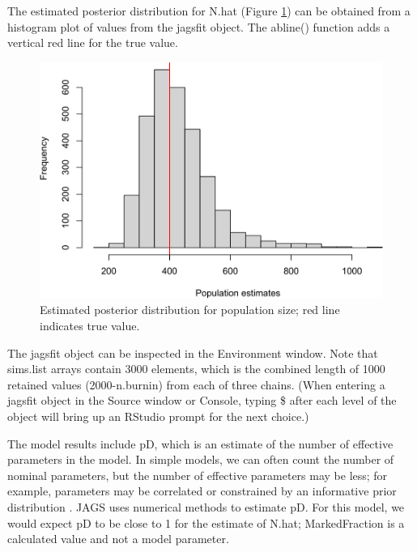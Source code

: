 \documentclass[
]{krantz}
\makeatletter
\newenvironment{Shaded}{\begin{snugshade}}{\end{snugshade}}
\newcommand{\AttributeTok}[1]{\textcolor[rgb]{0.27,0.27,0.27}{#1}}
\newcommand{\FunctionTok}[1]{\textcolor[rgb]{0.27,0.27,0.27}{\textbf{#1}}}
\newcommand{\NormalTok}[1]{#1}
\newcommand{\SpecialCharTok}[1]{\textcolor[rgb]{0.43,0.43,0.43}{\textbf{#1}}}
\newcommand{\StringTok}[1]{\textcolor[rgb]{0.5,0.5,0.5}{#1}}
\newenvironment{kframe}{%
\medskip{}
\setlength{\fboxsep}{.8em}
 \def\at@end@of@kframe{}%
 \ifinner\ifhmode%
  \def\at@end@of@kframe{\end{minipage}}%
  \begin{minipage}{\columnwidth}%
 \fi\fi%
 \def\FrameCommand##1{\hskip\@totalleftmargin \hskip-\fboxsep
 \colorbox{shadecolor}{##1}\hskip-\fboxsep
     \hskip-\linewidth \hskip-\@totalleftmargin \hskip\columnwidth}%
 \MakeFramed {\advance\hsize-\width
   \@totalleftmargin\z@ \linewidth\hsize
   \@setminipage}}%
 {\par\unskip\endMakeFramed%
 \at@end@of@kframe}
\renewenvironment{Shaded}{\begin{kframe}}{\end{kframe}}
\makeatother
\begin{document}
The estimated posterior distribution for N.hat (Figure \ref{fig:BayesMR}) can be obtained from a histogram plot of values from the jagsfit object. The abline() function adds a vertical red line for the true value.

\begin{Shaded}
\end{Shaded}

\begin{figure}
\includegraphics[width=0.9\linewidth]{bookdown_files/figure-latex/BayesMR-1} \caption{Estimated posterior distribution for population size; red line indicates true value.}\label{fig:BayesMR}
\end{figure}

The jagsfit object can be inspected in the Environment window. Note that sims.list arrays contain 3000 elements, which is the combined length of 1000 retained values (2000-n.burnin) from each of three chains. (When entering a jagsfit object in the Source window or Console, typing \$ after each level of the object will bring up an RStudio prompt for the next choice.)

The model results include pD, which is an estimate of the number of effective parameters in the model. In simple models, we can often count the number of nominal parameters, but the number of effective parameters may be less; for example, parameters may be correlated or constrained by an informative prior distribution \citep{mccarthy2007}. JAGS uses numerical methods to estimate pD. For this model, we would expect pD to be close to 1 for the estimate of N.hat; MarkedFraction is a calculated value and not a model parameter.
\end{document}
